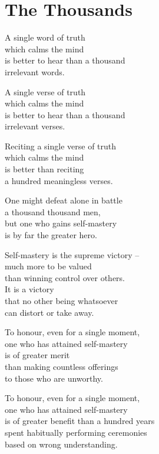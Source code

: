
\chapter{The Thousands}


A single word of truth\\
which calms the mind\\
is better to hear than a thousand\\
irrelevant words.


A single verse of truth\\
which calms the mind\\
is better to hear than a thousand\\
irrelevant verses.


Reciting a single verse of truth\\
which calms the mind\\
is better than reciting\\
a hundred meaningless verses.


One might defeat alone in battle\\
a thousand thousand men,\\
but one who gains self-mastery\\
is by far the greater hero.


Self-mastery is the supreme victory --\\
much more to be valued\\
than winning control over others.\\
It is a victory\\
that no other being whatsoever\\
can distort or take away.


To honour, even for a single moment,\\
one who has attained self-mastery\\
is of greater merit\\
than making countless offerings\\
to those who are unworthy.


To honour, even for a single moment,\\
one who has attained self-mastery\\
is of greater benefit than a hundred years\\
spent habitually performing ceremonies\\
based on wrong understanding.

